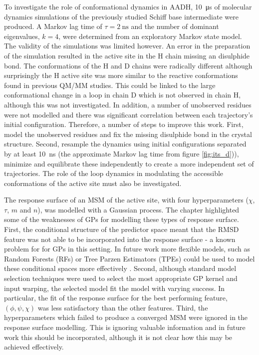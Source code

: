 To investigate the role of conformational dynamics in AADH, \SI{10}{\micro\second} of molecular dynamics simulations of the previously studied Schiff base intermediate were produced. A Markov lag time of $\tau=\SI{2}{\nano\second}$ and the number of dominant eigenvalues, $k=4$, were determined from an exploratory Markov state model. The validity of the simulations was limited however. An error in the preparation of the simulation resulted in the active site in the H chain missing an disulphide bond. The conformations of the H and D chains were radically different although surprisingly the H active site was more similar to the reactive conformations found in previous QM/MM studies. This could be linked to the large conformational change in a loop in chain D which is not observed in chain H, although this was not investigated. In addition, a number of unobserved residues were not modelled and there was significant correlation between each trajectory's initial configuration. Therefore, a number of steps to improve this work. First, model the unobserved residues and fix the missing disulphide bond in the crystal structure. Second, resample the dynamics using initial configurations separated by at least \SI{10}{\nano\second} (the approximate Markov lag time from figure \ref{fig:its_d})), minimize and equilibrate these independently to create a more independent set of trajectories. The role of the loop dynamics in modulating the accessible conformations of the active site must also be investigated. 

The response surface of an MSM of the active site, with four hyperparameters ($\chi$, $\tau$, $m$ and $n$), was modelled with a Gaussian process. The chapter highlighted some of the weaknesses of GPs for modelling these types of response surface. First, the conditional structure of the predictor space meant that the RMSD feature was not able to be incorporated into the response surface - a known problem for for GPs in this setting. In future work more flexible models, such as Random Forests (RFs) or Tree Parzen Estimators (TPEs) could be used to model these conditional spaces more effectively \cite{bergstraAlgorithmsHyperParameterOptimizationa}. Second, although standard model selection techniques were used to select the most appropriate GP kernel and input warping, the selected model fit the model with varying success. In particular, the fit of the response surface for the best performing feature, $(\phi, \psi, \chi)$  was less satisfactory than the other features. Third, the hyperparameters which failed to produce a converged MSM were ignored in the response surface modelling. This is ignoring valuable information and in future work this should be incorporated, although it is not clear how this may be achieved effectively. 

